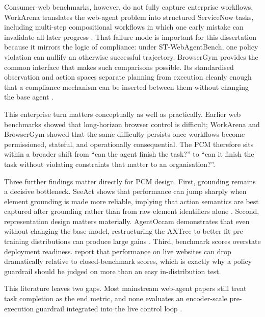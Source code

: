 \documentclass[12pt,a4paper]{article}
\begin{document}
Consumer-web benchmarks, however, do not fully capture enterprise workflows.
WorkArena translates the web-agent problem into structured ServiceNow tasks,
including multi-step compositional workflows in which one early mistake can
invalidate all later progress \citep{drouin2024workarena}. That failure mode is
important for this dissertation because it mirrors the logic of compliance:
under ST-WebAgentBench, one policy violation can nullify an otherwise successful
trajectory. BrowserGym provides the common interface that makes such comparisons
possible. Its standardised observation and action spaces separate planning from
execution cleanly enough that a compliance mechanism can be inserted between
them without changing the base agent \citep{chezelles2025browsergym}.

This enterprise turn matters conceptually as well as practically. Earlier web
benchmarks showed that long-horizon browser control is difficult; WorkArena and
BrowserGym showed that the same difficulty persists once workflows become
permissioned, stateful, and operationally consequential. The PCM therefore sits
within a broader shift from ``can the agent finish the task?'' to ``can it
finish the task without violating constraints that matter to an organisation?''.

Three further findings matter directly for PCM design. First, grounding remains
a decisive bottleneck. SeeAct shows that performance can jump sharply when
element grounding is made more reliable, implying that action semantics are best
captured after grounding rather than from raw element identifiers alone
\citep{zheng2024seeact}. Second, representation design matters materially.
AgentOccam demonstrates that even without changing the base model, restructuring
the AXTree to better fit pre-training distributions can produce large gains
\citep{yang2025agentoccam}. Third, benchmark scores overstate deployment
readiness. \citet{xue2025illusion} report that performance on live websites can
drop dramatically relative to closed-benchmark scores, which is exactly why a
policy guardrail should be judged on more than an easy in-distribution test.

This literature leaves two gaps. Most mainstream web-agent papers still treat
task completion as the end metric, and none evaluates an encoder-scale
pre-execution guardrail integrated into the live control loop
\citep{zhou2024webarena,drouin2024workarena,chezelles2025browsergym}.

\end{document}
